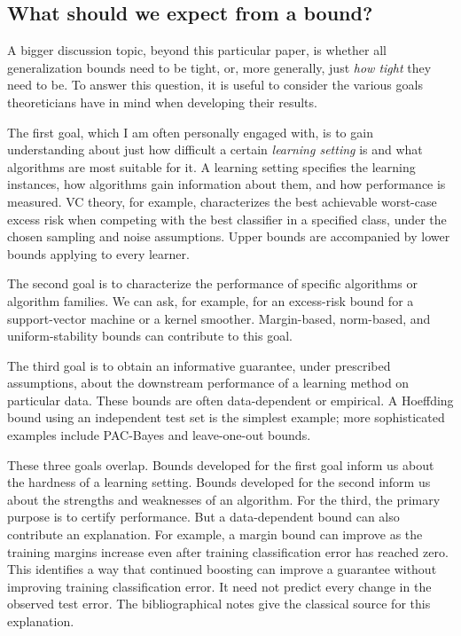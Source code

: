 \documentclass[11pt,twoside]{article}
\theoremstyle{definition}
\theoremstyle{remark}
\begin{document}
\subsection{What should we expect from a bound?}

A bigger discussion topic, beyond this particular paper, is whether all
generalization bounds need to be tight, or, more generally, just \emph{how
tight} they need to be. To answer this question, it is useful to consider
the various goals theoreticians have in mind when developing their results.

The first goal, which I am often personally engaged with, is to gain
understanding about just how difficult a certain \emph{learning setting} is
and what algorithms are most suitable for it. A learning setting specifies
the learning instances, how algorithms gain information about them, and how
performance is measured. VC theory, for example, characterizes the best
achievable worst-case excess risk when competing with the best classifier
in a specified class, under the chosen sampling and noise assumptions.
Upper bounds are accompanied by lower bounds applying to every learner.

The second goal is to characterize the performance of specific algorithms
or algorithm families. We can ask, for example, for an excess-risk bound
for a support-vector machine or a kernel smoother. Margin-based, norm-based,
and uniform-stability bounds can contribute to this goal.

The third goal is to obtain an informative guarantee, under prescribed
assumptions, about the downstream performance of a learning method on
particular data. These bounds are often data-dependent or empirical. A
Hoeffding bound using an independent test set is the simplest example;
more sophisticated examples include PAC-Bayes and leave-one-out bounds.

These three goals overlap. Bounds developed for the first goal inform us
about the hardness of a learning setting. Bounds developed for the second
inform us about the strengths and weaknesses of an algorithm. For the third,
the primary purpose is to certify performance. But a data-dependent bound
can also contribute an explanation. For example, a margin bound can improve
as the training margins increase even after training classification error
has reached zero. This identifies a way that continued boosting can improve
a guarantee without improving training classification error. It need not
predict every change in the observed test error. The bibliographical notes
give the classical source for this explanation.
\end{document}
